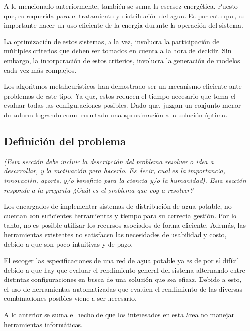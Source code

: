 \documentclass[11pt,letterpaper]{article}
\begin{document}
A lo mencionado anteriormente, también se suma la escasez energética. Puesto que, es requerida para el tratamiento y distribución del agua. Es por esto que, es importante hacer un uso eficiente de la energia durante la operación del sistema.

La optimización de estos sistemas, a la vez, involucra la participación de múltiples criterios que deben ser tomados en cuenta a la hora de decidir. Sin embargo, la incorporación de estos criterios, involucra la generación de modelos cada vez más complejos.

Los algoritmos metaheurísticos han demostrado ser un mecanismo eficiente ante problemas de este tipo. Ya que, estos reducen el tiempo necesario que toma el evaluar todas las configuraciones posibles. Dado que, juzgan un conjunto menor de valores logrando como resultado una aproximación a la solución óptima.

\subsection{Definición del problema} 
\emph{(Esta sección debe incluir la descripción del problema resolver o idea a desarrollar, y la motivación para hacerlo. Es decir, cual es la importancia, innovación, aporte, y/o beneficio para la ciencia y/o la humanidad). Esta sección responde a la pregunta ¿Cuál es el problema que voy a resolver?}

Los encargados de implementar sistemas de distribución de agua potable, no cuentan con suficientes herramientas y  tiempo para su correcta gestión. Por lo tanto, no es posible utilizar los recursos asociados de forma eficiente. Además, las herramientas existentes no satisfacen las necesidades de usabilidad y costo, debido a que son poco intuitivas y de pago.

El escoger las especificaciones de una red de agua potable ya es de por sí difícil debido a que hay que evaluar el rendimiento general del sistema alternando entre distintas configuraciones en busca de una solución que sea eficaz. Debido a esto, el uso de herramientas automatizadas que evalúen el rendimiento de las diversas combinaciones posibles viene a ser necesario.

A lo anterior se suma el hecho de que los interesados en esta área no manejan herramientas informáticas.

\end{document}
